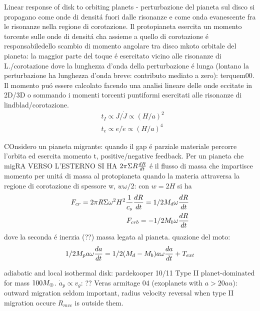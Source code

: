 \begin{workout}
Linear response of disk to orbiting planets - perturbazione del pianeta sul disco si propagano come onde di densit\'a fuori dalle risonanze e come onda evanescente fra le risonanze nella regione di corotazione. Il protopianeta esercita un momento torcente sulle onde di densit\'a cha assieme  a quello di corotazione \'e responsabiledello scambio di momento angolare tra disco mkoto orbitale del pianeta: la maggior parte del toque \'e esercitato vicino alle risonanze di L./corotazione dove la lunghezza d'onda della perturbazione \'e lunga (lontano la perturbazione ha lunghezza d'onda breve: contributo mediato a zero): terquem00.
Il momento pu\'o essere calcolato facendo una analisi lineare delle onde eccitate in 2D/3D o sommando i momenti torcenti puntiformi esercitati alle risonanze di lindblad/corotazione.
\begin{align}
&t_I\propto J/\dot{J}\propto(H/a)^2\\
&t_e\propto e/\dot{e}\propto(H/a)^4
\end{align}
\end{workout}

\begin{workout}
COnsidero un pianeta migrante: quando il gap \'e parziale materiale percorre l'orbita ed esercita momento t, positive/negative feedback.
Per un pianeta che migRA VERSO L'ESTERNO SI HA
$2\pi\Sigma R\TDy{t}{R}$ \'e il flusso di massa che impartisce momento per unit\'a di massa al protopianeta quando la materia attraversa la regione di corotazione di spessore w, $w\omega/2$: con $w=2H$ si ha
\begin{align}
F_{cr}=2\pi R\Sigma\omega^2 H^2\frac{1}{c_s}\TDy{t}{R}=1/2M_d\omega\TDy{t}{R}\\
F_{crb}=-1/2M_b\omega\TDy{t}{R}
\end{align}
dove la seconda \'e inerzia (??) massa legata al pianeta.
quazione del moto:
\begin{equation}
1/2M_pa\omega\TDy{t}{a}=1/2(M_d-M_b)a\omega\TDy{t}{a}+T_{ext}
\end{equation}
\end{workout}

\begin{workout}
adiabatic and local isothermal disk: pardekooper 10/11
Type II planet-dominated for mass $100\mearth{}$.
$\dot{a}_p\propto v_g$: ??
Veras armitage 04 (exoplanets with $a>20au$): outward migration seldom important, radius velocity reversal when type II migration occure $R_{mvc}$ is outside them.
\end{workout}


